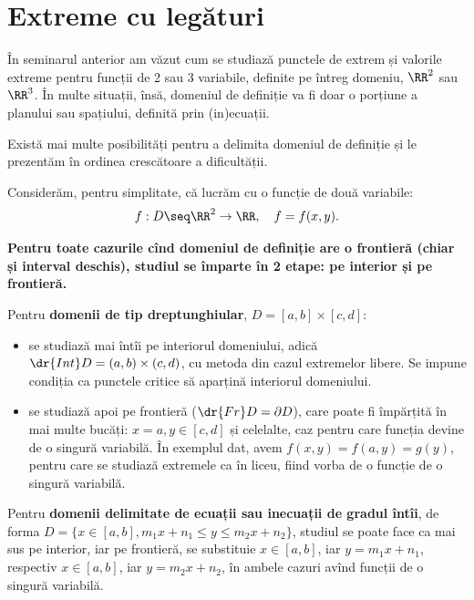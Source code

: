 
\chapter{Extreme cu legături}


În seminarul anterior am văzut cum se studiază punctele de extrem
și valorile extreme pentru funcții de 2 sau 3 variabile, definite
pe întreg domeniu, $ \RR^2 $ sau $ \RR^3 $. În multe situații, însă,
domeniul de definiție va fi doar o porțiune a planului sau spațiului,
definită prin (in)ecuații.

Există mai multe posibilități pentru a delimita domeniul de definiție
și le prezentăm în ordinea crescătoare a dificultății.

Considerăm, pentru simplitate, că lucrăm cu o funcție de două variabile:
\[
    f : D \seq \RR^2 \to \RR, \quad f = f(x, y).
\]

\textbf{Pentru toate cazurile cînd domeniul de definiție are o frontieră
    (chiar și interval deschis), studiul se împarte în 2 etape: pe interior
și pe frontieră.}

Pentru \textbf{domenii de tip dreptunghiular}, $ D = [a, b] \times [c, d] $:
\begin{itemize}
    \item se studiază mai întîi pe interiorul domeniului, adică
        $ \dr{Int} D = (a, b) \times (c, d) $, cu metoda din cazul extremelor libere.
        Se impune condiția ca punctele critice să aparțină interiorul domeniului.
    \item se studiază apoi pe frontieră ($\dr{Fr}D = \partial D $), care poate fi 
        împărțită în mai multe bucăți: $ x = a, y \in [c, d] $ și celelalte,
        caz pentru care funcția devine de o singură variabilă. În exemplul dat,
        avem $ f(x, y) = f(a, y) = g(y) $, pentru care se studiază extremele
        ca în liceu, fiind vorba de o funcție de o singură variabilă.
\end{itemize}

Pentru \textbf{domenii delimitate de ecuații sau inecuații de gradul întîi}, de
forma $ D = \{ x \in [a, b], m_1 x + n_1 \leq y \leq m_2 x + n_2 \} $, 
studiul se poate face ca mai sus pe interior, iar pe frontieră, se substituie
$ x \in [a, b] $, iar $ y = m_1 x + n_1 $, respectiv $ x \in [a, b] $,
iar $ y = m_2 x + n_2 $, în ambele cazuri avînd funcții de o singură variabilă.

